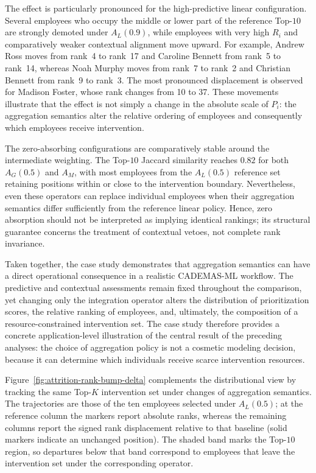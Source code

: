 \documentclass[mathematics,article,submit,moreauthors]{Definitions/mdpi}
\begin{document}
The effect is particularly pronounced for the high-predictive linear
configuration. Several employees who occupy the middle or lower part of
the reference Top-$10$ are strongly demoted under $A_L(0.9)$, while
employees with very high $R_i$ and comparatively weaker contextual
alignment move upward. For example, Andrew Ross moves from rank~4 to
rank~17 and Caroline Bennett from rank~5 to rank~14, whereas Noah Murphy
moves from rank~7 to rank~2 and Christian Bennett from rank~9 to rank~3.
The most pronounced displacement is observed for Madison Foster, whose
rank changes from 10 to 37. These movements illustrate that the effect is
not simply a change in the absolute scale of $P_i$: the aggregation
semantics alter the relative ordering of employees and consequently which
employees receive intervention.

The zero-absorbing configurations are comparatively stable around the
intermediate weighting. The Top-$10$ Jaccard similarity reaches $0.82$ for
both $A_G(0.5)$ and $A_M$, with most employees from the $A_L(0.5)$ reference
set retaining positions within or close to the intervention boundary.
Nevertheless, even these operators can replace individual employees when
their aggregation semantics differ sufficiently from the reference
linear policy. Hence, zero absorption should not be interpreted as implying
identical rankings; its structural guarantee concerns the treatment of
contextual vetoes, not complete rank invariance.

Taken together, the case study demonstrates that aggregation semantics can
have a direct operational consequence in a realistic CADEMAS-ML workflow.
The predictive and contextual assessments remain fixed throughout the
comparison, yet changing only the integration operator alters the
distribution of prioritization scores, the relative ranking of employees,
and, ultimately, the composition of a resource-constrained intervention
set. The case study therefore provides a concrete application-level
illustration of the central result of the preceding analyses: the choice
of aggregation policy is not a cosmetic modeling decision, because it can
determine which individuals receive scarce intervention resources.


Figure~\ref{fig:attrition-rank-bump-delta} complements the distributional view by
tracking the same Top-$K$ intervention set under changes of aggregation
semantics. The trajectories are those of the ten employees selected under
$A_L(0.5)$; at the reference column the markers report absolute ranks,
whereas the remaining columns report the signed rank displacement relative
to that baseline (solid markers indicate an unchanged position). The shaded
band marks the Top-$10$ region, so departures below that band correspond to
employees that leave the intervention set under the corresponding operator.
\end{document}
